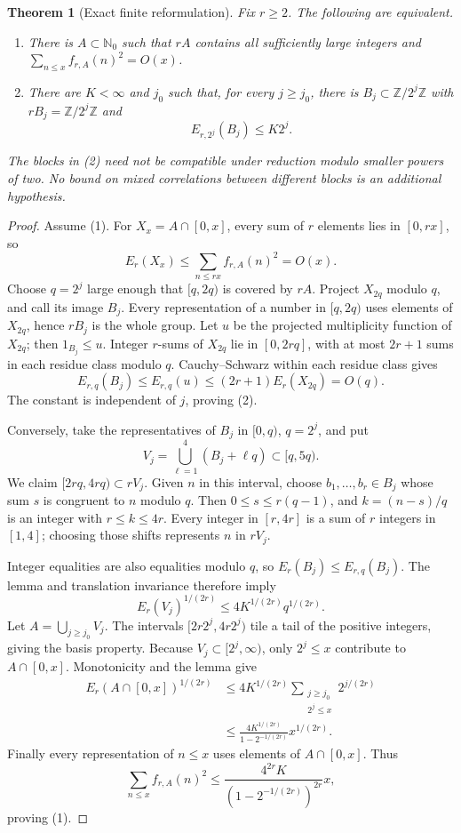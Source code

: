\documentclass[11pt]{article}
\newtheorem{theorem}{Theorem}
\begin{document}
\begin{theorem}[Exact finite reformulation]
Fix $r\ge2$. The following are equivalent.
\begin{enumerate}
\item There is $A\subset\mathbb N_0$ such that $rA$ contains all sufficiently
large integers and $\sum_{n\le x}f_{r,A}(n)^2=O(x)$.
\item There are $K<\infty$ and $j_0$ such that, for every $j\ge j_0$, there
is $B_j\subset\mathbb Z/2^j\mathbb Z$ with $rB_j=\mathbb Z/2^j\mathbb Z$ and
\[
 E_{r,2^j}(B_j)\le K2^j.
\]
\end{enumerate}
The blocks in (2) need not be compatible under reduction modulo smaller
powers of two. No bound on mixed correlations between different blocks is
an additional hypothesis.
\end{theorem}
\begin{proof}
Assume (1). For $X_x=A\cap[0,x]$, every sum of $r$ elements lies in $[0,rx]$,
so
\[
 E_r(X_x)\le\sum_{n\le rx}f_{r,A}(n)^2=O(x).
\]
Choose $q=2^j$ large enough that $[q,2q)$ is covered by $rA$. Project
$X_{2q}$ modulo $q$, and call its image $B_j$. Every representation of a
number in $[q,2q)$ uses elements of $X_{2q}$, hence $rB_j$ is the whole group.
Let $u$ be the projected multiplicity function of $X_{2q}$; then $1_{B_j}\le u$.
Integer $r$-sums of $X_{2q}$ lie in $[0,2rq]$, with at most $2r+1$ sums in
each residue class modulo $q$. Cauchy--Schwarz within each residue class gives
\[
 E_{r,q}(B_j)\le E_{r,q}(u)\le(2r+1)E_r(X_{2q})=O(q).
\]
The constant is independent of $j$, proving (2).

Conversely, take the representatives of $B_j$ in $[0,q)$, $q=2^j$, and put
\[
 V_j=\bigcup_{\ell=1}^4(B_j+\ell q)\subset[q,5q).
\]
We claim $[2rq,4rq)\subset rV_j$. Given $n$ in this interval, choose
$b_1,\ldots,b_r\in B_j$ whose sum $s$ is congruent to $n$ modulo $q$.
Then $0\le s\le r(q-1)$, and $k=(n-s)/q$ is an integer with $r\le k\le4r$.
Every integer in $[r,4r]$ is a sum of $r$ integers in $[1,4]$; choosing
those shifts represents $n$ in $rV_j$.

Integer equalities are also equalities modulo $q$, so $E_r(B_j)\le E_{r,q}(B_j)$.
The lemma and translation invariance therefore imply
\[
 E_r(V_j)^{1/(2r)}\le4K^{1/(2r)}q^{1/(2r)}.
\]
Let $A=\bigcup_{j\ge j_0}V_j$. The intervals $[2r2^j,4r2^j)$ tile a tail
of the positive integers, giving the basis property. Because $V_j\subset[2^j,\infty)$,
only $2^j\le x$ contribute to $A\cap[0,x]$. Monotonicity and the lemma give
\[
\begin{split}
 E_r(A\cap[0,x])^{1/(2r)}
 &\le4K^{1/(2r)}\sum_{\substack{j\ge j_0\\2^j\le x}}2^{j/(2r)}\\
 &\le\frac{4K^{1/(2r)}}{1-2^{-1/(2r)}}x^{1/(2r)}.
\end{split}
\]
Finally every representation of $n\le x$ uses elements of $A\cap[0,x]$.
Thus
\[
 \sum_{n\le x} f_{r,A}(n)^2
 \le\frac{4^{2r}K}{(1-2^{-1/(2r)})^{2r}}x,
\]
proving (1).
\end{proof}
\end{document}
